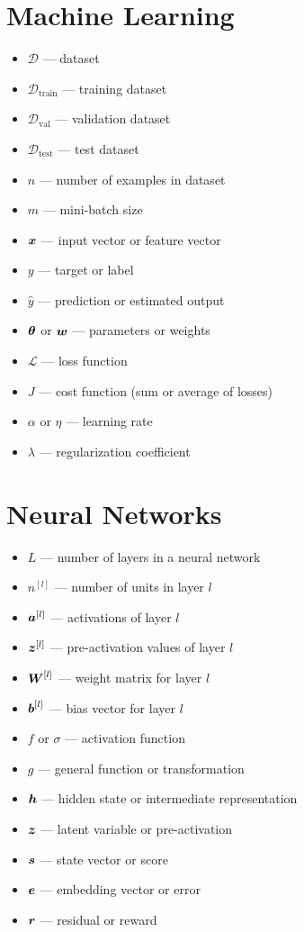 \section*{Machine Learning}

\begin{itemize}[leftmargin=2em]
    \item $\mathcal{D}$ --- dataset
    \item $\mathcal{D}_{\text{train}}$ --- training dataset
    \item $\mathcal{D}_{\text{val}}$ --- validation dataset
    \item $\mathcal{D}_{\text{test}}$ --- test dataset
    \item $n$ --- number of examples in dataset
    \item $m$ --- mini-batch size
    \item $\boldsymbol{x}$ --- input vector or feature vector
    \item $y$ --- target or label
    \item $\hat{y}$ --- prediction or estimated output
    \item $\boldsymbol{\theta}$ or $\boldsymbol{w}$ --- parameters or weights
    \item $\mathcal{L}$ --- loss function
    \item $J$ --- cost function (sum or average of losses)
    \item $\alpha$ or $\eta$ --- learning rate
    \item $\lambda$ --- regularization coefficient
\end{itemize}

\section*{Neural Networks}

\begin{itemize}[leftmargin=2em]
    \item $L$ --- number of layers in a neural network
    \item $n^{[l]}$ --- number of units in layer $l$
    \item $\boldsymbol{a}^{[l]}$ --- activations of layer $l$
    \item $\boldsymbol{z}^{[l]}$ --- pre-activation values of layer $l$
    \item $\boldsymbol{W}^{[l]}$ --- weight matrix for layer $l$
    \item $\boldsymbol{b}^{[l]}$ --- bias vector for layer $l$
    \item $f$ or $\sigma$ --- activation function
    \item $g$ --- general function or transformation
    \item $\boldsymbol{h}$ --- hidden state or intermediate representation
    \item $\boldsymbol{z}$ --- latent variable or pre-activation
    \item $\boldsymbol{s}$ --- state vector or score
    \item $\boldsymbol{e}$ --- embedding vector or error
    \item $\boldsymbol{r}$ --- residual or reward
\end{itemize}

